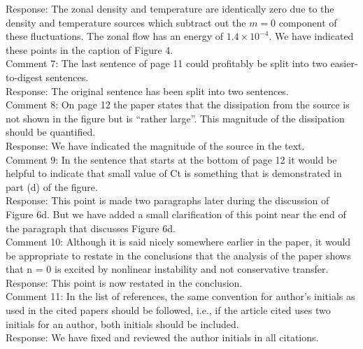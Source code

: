\documentclass[12pt]{article}
\begin{document}
Response: The zonal density and temperature are identically zero due to the density and temperature sources which subtract out the $m=0$ component of these fluctuations. The zonal flow has an energy
of $1.4 \times 10^{-4}$. We have indicated these points in the caption of Figure 4. \\

Comment 7:   The last sentence of page 11 could profitably be split into two easier-to-digest sentences. \\

Response: The original sentence has been split into two sentences. \\

Comment 8:   On page 12 the paper states that the dissipation from the source is not shown in the
figure but is “rather large”. This magnitude of the dissipation should be quantified. \\

Response: We have indicated the magnitude of the source in the text. \\

Comment 9:   In the sentence that starts at the bottom of page 12 it would be helpful to indicate that
small value of Ct is something that is demonstrated in part (d) of the figure. \\

Response: This point is made two paragraphs later during the discussion of Figure 6d. But we have added a small clarification of this point near the end of the paragraph that discusses Figure 6d. \\

Comment 10:   Although it is said nicely somewhere earlier in the paper, it would be appropriate to
restate in the conclusions that the analysis of the paper shows that n = 0 is excited by
nonlinear instability and not conservative transfer. \\

Response: This point is now restated in the conclusion. \\

Comment 11:  In the list of references, the same convention for author’s initials as used in the cited
papers should be followed, i.e., if the article cited uses two initials for an author, both
initials should be included. \\

Response: We have fixed and reviewed the author initials in all citations. \\
\end{document}
